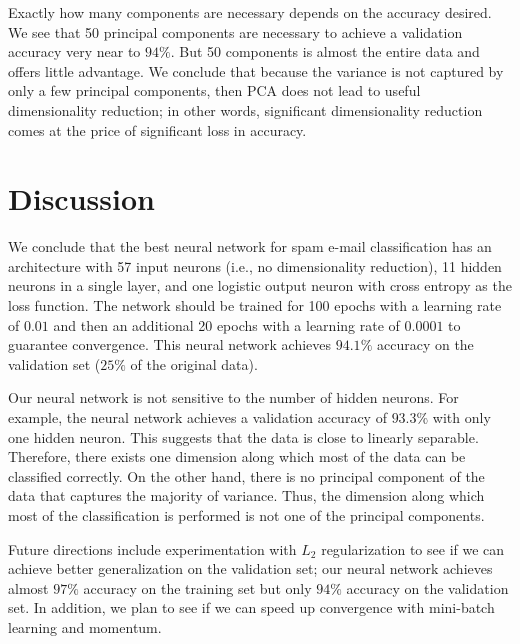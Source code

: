 \documentclass[12pt]{article}
\begin{document}
Exactly how many components are necessary depends on the accuracy desired. We see that 50 principal components are necessary to achieve a validation accuracy very near to $94\%$. But 50 components is almost the entire data and offers little advantage. We conclude that because the variance is not captured by only a few principal components, then PCA does not lead to useful dimensionality reduction; in other words, significant dimensionality reduction comes at the price of significant loss in accuracy.


\section{Discussion}

We conclude that the best neural network for spam e-mail classification has an architecture with 57 input neurons (i.e., no dimensionality reduction), 11 hidden neurons in a single layer, and one logistic output neuron with cross entropy as the loss function. The network should be trained for 100 epochs with a learning rate of $0.01$ and then an additional 20 epochs with a learning rate of $0.0001$ to guarantee convergence. This neural network achieves $94.1\%$ accuracy on the validation set ($25\%$ of the original data).

Our neural network is not sensitive to the number of hidden neurons. For example, the neural network achieves a validation accuracy of $93.3\%$ with only one hidden neuron. This suggests that the data is close to linearly separable. Therefore, there exists one dimension along which most of the data can be classified correctly. On the other hand, there is no principal component of the data that captures the majority of variance. Thus, the dimension along which most of the classification is performed is not one of the principal components.

Future directions include experimentation with $L_2$ regularization to see if we can achieve better generalization on the validation set; our neural network achieves almost $97\%$ accuracy on the training set but only $94\%$ accuracy on the validation set. In addition, we plan to see if we can speed up convergence with mini-batch learning and momentum.
\end{document}
